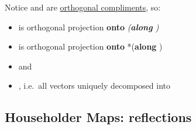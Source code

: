 \hSep %

Notice  and  are \underline{orthogonal compliments}, so:

\begin{itemize}

      \item
            is orthogonal projection \textbf{onto} 
            \emph{(\textbf{along} )}
      \item
            is orthogonal projection \textbf{onto}  *(\textbf{along}
            )
      \item
            and
      \item
            ,
            i.e.~all vectors  uniquely
            decomposed into
\end{itemize}


\subsection*{Householder Maps: reflections}

